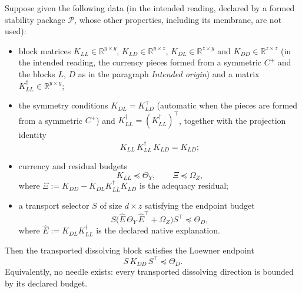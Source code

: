 \begin{theorem}\label{thm:F6}
Suppose given the following data (in the intended reading, declared by a
formed stability package \(\mathcal P\), whose other properties, including its
membrane, are not used):
\begin{itemize}
  \item block matrices \(K_{LL}\in\mathbb R^{y\times y}\),
  \(K_{LD}\in\mathbb R^{y\times z}\), \(K_{DL}\in\mathbb R^{z\times y}\) and
  \(K_{DD}\in\mathbb R^{z\times z}\) (in the intended reading, the currency pieces
  formed from a symmetric \(C^{+}\) and the blocks \(L\), \(D\) as in the paragraph \emph{Intended origin}) and a matrix \(K_{LL}^{\dagger}\in\mathbb R^{y\times y}\);
  \item the symmetry conditions \(K_{DL}=K_{LD}^{\!\top}\) (automatic when the
  pieces are formed from a symmetric \(C^{+}\)) and
  \(K_{LL}^{\dagger}=(K_{LL}^{\dagger})^{\!\top}\), together with the
  projection identity
  \[
    K_{LL}\,K_{LL}^{\dagger}\,K_{LD}=K_{LD};
  \]
  \item currency and residual budgets
  \[
    K_{LL}\preceq \Theta_Y,
    \qquad
    \Xi\preceq \Omega_Z,
  \]
  where \(\Xi:=K_{DD}-K_{DL}K_{LL}^{\dagger}K_{LD}\) is the adequacy residual;
  \item a transport selector \(S\) of size \(d\times z\) satisfying
  the endpoint budget
  \[
    S\bigl(\widehat E\,\Theta_Y\,\widehat E^{\!\top}
      +\Omega_Z\bigr)S^{\!\top}\preceq\Theta_D,
  \]
  where \(\widehat E:=K_{DL}K_{LL}^{\dagger}\) is the declared native
  explanation.
\end{itemize}
Then the transported dissolving block satisfies the Loewner endpoint
\[
  S\,K_{DD}\,S^{\!\top}\preceq\Theta_D .
\]
Equivalently, no needle exists: every transported dissolving direction is
bounded by its declared budget.
\end{theorem}
